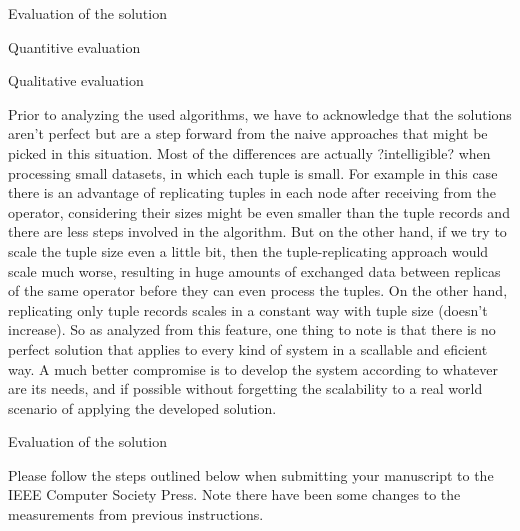 \documentclass[times, 10pt,twocolumn]{article}
\begin{document}

Evaluation of the solution


Quantitive evaluation


Qualitative evaluation


Prior to analyzing the used algorithms, we have to acknowledge that the
solutions aren't perfect but are a step forward from the naive approaches
that might be picked in this situation. Most of the differences are actually
?intelligible? when processing small datasets, in which each tuple is small.
For example in this case there is an advantage of replicating tuples in each
node after receiving from the operator, considering their sizes might be even
smaller than the tuple records and there are less steps involved in the
algorithm. But on the other hand, if we try to scale the tuple size even
a little bit, then the tuple-replicating approach would scale much worse,
resulting in huge amounts of exchanged data between replicas of the same
operator before they can even process the tuples. On the other hand, replicating
only tuple records scales in a constant way with tuple size (doesn't increase).
So as analyzed from this feature, one thing to note is that there is no perfect
solution that applies to every kind of system in a scallable and eficient way.
A much better compromise is to develop the system according to whatever are
its needs, and if possible without forgetting the scalability to a real world
scenario of applying the developed solution.


Evaluation of the solution


Please follow the steps outlined below when submitting your manuscript to
the IEEE Computer Society Press. Note there have been some changes to the
measurements from previous instructions. 
\end{document}
